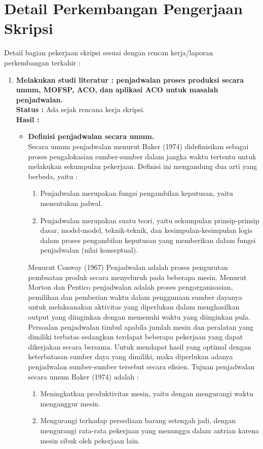\documentclass[a4paper,twoside]{article}
\begin{document}
\section{Detail Perkembangan Pengerjaan Skripsi}
Detail bagian pekerjaan skripsi sesuai dengan rencan kerja/laporan perkembangan terkahir :
	\begin{enumerate}
		\item \textbf{Melakukan studi literatur : penjadwalan proses produksi secara umum, MOFSP, ACO, dan aplikasi ACO untuk masalah penjadwalan.}\\
		{\bf Status :} Ada sejak rencana kerja skripsi.\\
		{\bf Hasil :}
		\begin{itemize}
		\item {\bf Definisi penjadwalan secara umum.}\\
		Secara umum penjadwalan menurut Baker (1974) didefinisikan sebagai proses pengalokasian sumber-sumber dalam    jangka waktu tertentu untuk melakukan sekumpulan pekerjaan. Definisi ini mengandung dua arti yang berbeda, yaitu :
		\begin{enumerate}
		\item Penjadwalan merupakan fungsi pengambilan keputusan, yaitu menentukan jadwal. 
		\item Penjadwalan merupakan suatu teori, yaitu sekumpulan prinsip-prinsip dasar, model-model, teknik-teknik, dan kesimpulan-kesimpulan logis dalam proses pengambilan keputusan yang memberikan dalam fungsi penjadwalan (nilai konseptual).
		\end{enumerate}
		Menurut Conway (1967) Penjadwalan adalah proses pengurutan pembuatan produk secara menyeluruh pada beberapa mesin. Menurut Morton dan Pentico penjadwalan adalah proses pengorganisasian, pemilihan dan pemberian waktu dalam penggunaan sumber dayanya untuk melaksanakan aktivitas yang diperlukan dalam menghasilkan output yang diinginkan dengan memenuhi waktu yang diinginkan pula.
		Persoalan penjadwalan timbul apabila jumlah mesin dan peralatan yang dimiliki terbatas sedangkan terdapat beberapa pekerjaan yang dapat dikerjakan secara bersama. Untuk mendapat hasil yang optimal dengan keterbatasan sumber daya yang dimiliki, maka diperlukan adanya penjadwalan sumber-sumber tersebut secara efisien.
		Tujuan penjadwalan secara umum Baker (1974) adalah :
		\begin{enumerate}
		\item Meningkatkan produktivitas mesin, yaitu dengan mengurangi waktu menganggur mesin.
		\item Mengurangi terhadap persediaan barang setengah jadi, dengan mengurangi rata-rata pekerjaan yang menunggu dalam antrian karena mesin sibuk oleh pekerjaan lain.

\end{enumerate}
\end{itemize}
\end{enumerate}
\end{document}
